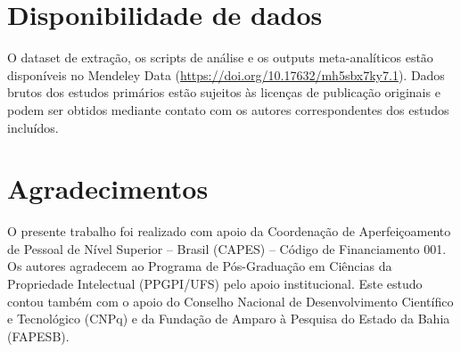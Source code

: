 \section*{Disponibilidade de dados}

O dataset de extração, os scripts de análise e os outputs meta-analíticos estão disponíveis no Mendeley Data (\url{https://doi.org/10.17632/mh5sbx7ky7.1}). Dados brutos dos estudos primários estão sujeitos às licenças de publicação originais e podem ser obtidos mediante contato com os autores correspondentes dos estudos incluídos.


\section*{Agradecimentos}

O presente trabalho foi realizado com apoio da Coordenação de Aperfeiçoamento de Pessoal de Nível Superior -- Brasil (CAPES) -- Código de Financiamento 001. Os autores agradecem ao Programa de Pós-Graduação em Ciências da Propriedade Intelectual (PPGPI/UFS) pelo apoio institucional. Este estudo contou também com o apoio do Conselho Nacional de Desenvolvimento Científico e Tecnológico (CNPq) e da Fundação de Amparo à Pesquisa do Estado da Bahia (FAPESB).
